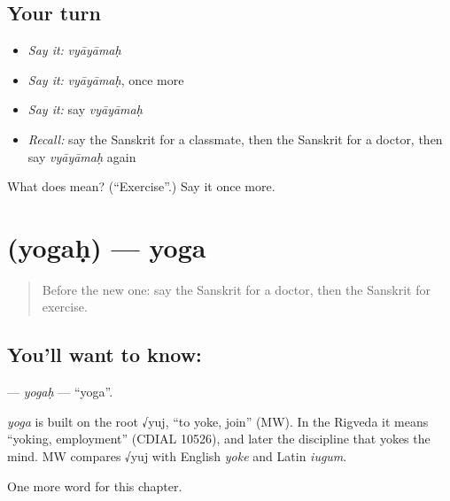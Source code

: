 \subsection*{Your turn}
\begin{itemize}
\raggedright
  \item \emph{Say it:} \emph{vyāyāmaḥ}
  \item \emph{Say it:} \emph{vyāyāmaḥ}, once more
  \item \emph{Say it:} say \emph{vyāyāmaḥ}
  \item \emph{Recall:} say the Sanskrit for a classmate, then the Sanskrit for a doctor, then say \emph{vyāyāmaḥ} again
\end{itemize}

\begin{tcolorbox}[breakable,colback=teal!4,colframe=teal!35!black,title={Before you move on}]
What does  mean? (\textquotedblleft{}Exercise\textquotedblright{}.) Say it once more.
\end{tcolorbox}
\section[\texorpdfstring{\sk{योगः} (yogaḥ)}{योगः (yogaḥ)}]{ (yogaḥ) — yoga}

\label{lesson:SA-C211-yogah}



\begin{quote}
Before the new one: say the Sanskrit for a doctor, then the Sanskrit for exercise.
\end{quote}

\subsection*{You'll want to know: }
\textbf{} — \emph{yogaḥ} — \textquotedblleft{}yoga\textquotedblright{}.

\begin{cousinweb}
\emph{yoga} is built on the root √yuj, \textquotedblleft{}to yoke, join\textquotedblright{} (MW). In the Rigveda it means \textquotedblleft{}yoking, employment\textquotedblright{} (CDIAL 10526), and later the discipline that yokes the mind. MW compares √yuj with English \emph{yoke} and Latin \emph{iugum}.
\end{cousinweb}

\begin{grammarlens}[title={What you've built}]
One more word for this chapter.
\end{grammarlens}

